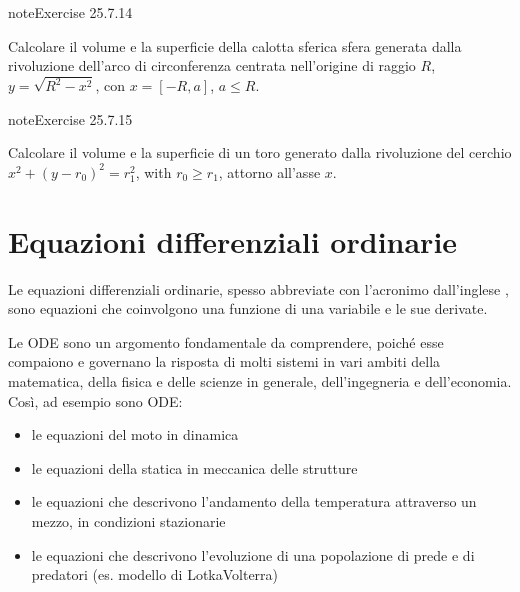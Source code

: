 \documentclass[letterpaper,10pt,italian]{jupyterBook}
\begin{document}
\begin{sphinxadmonition}{note}{Exercise 25.7.14}





\sphinxAtStartPar
Calcolare il volume e la superficie della calotta sferica sfera generata dalla rivoluzione dell’arco di circonferenza centrata nell’origine di raggio \(R\), \(y = \sqrt{R^2 - x^2}\), con \(x = [-R, a]\), \(a \le R\).
\end{sphinxadmonition}
 \label{exercise:ch/infinitesimal_calculus/integrals-problems-exercise-14}

\begin{sphinxadmonition}{note}{Exercise 25.7.15}





\sphinxAtStartPar
Calcolare il volume e la superficie di un toro generato dalla rivoluzione del cerchio \(x^2 + (y-r_0)^2 = r_1^2\), with \(r_0 \ge r_1\), attorno all’asse \(x\).
\end{sphinxadmonition}



\sphinxstepscope




\chapter{Equazioni differenziali ordinarie}
\label{\detokenize{ch/ode:equazioni-differenziali-ordinarie}}\label{\detokenize{ch/ode:ode-hs}}\label{\detokenize{ch/ode::doc}}
\sphinxAtStartPar
Le equazioni differenziali ordinarie, spesso abbreviate con l’acronimo  dall’inglese , sono equazioni che coinvolgono una funzione di una variabile e le sue derivate.

\sphinxAtStartPar
{} Le ODE sono un argomento fondamentale da comprendere, poiché esse compaiono e governano la risposta di molti sistemi in vari ambiti della matematica, della fisica e delle scienze in generale, dell’ingegneria e dell’economia. Così, ad esempio sono ODE:
\begin{itemize}
\item {} 
\sphinxAtStartPar
le equazioni del moto in dinamica

\item {} 
\sphinxAtStartPar
le equazioni della statica in meccanica delle strutture

\item {} 
\sphinxAtStartPar
le equazioni che descrivono l’andamento della temperatura attraverso un mezzo, in condizioni stazionarie

\item {} 
\sphinxAtStartPar
le equazioni che descrivono l’evoluzione di una popolazione di prede e di predatori (es. modello di Lotka\sphinxhyphen{}Volterra)

\end{itemize}
\end{document}
